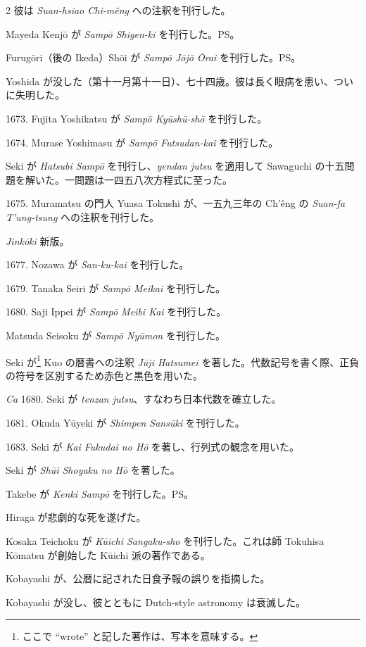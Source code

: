 \documentclass[11pt]{article}
\newcommand{\scanpage}[2]{\clearpage\setcounter{footnote}{0}\noindent{\footnotesize\color{gray}PDF #1 頁 · #2}\par\medskip}
\begin{document}
\scanpage{0195}{第23章年表、印刷頁181}
\begin{multicols}{2}\small
彼は \emph{Suan-hsiao Chi-mêng} への注釈を刊行した。

Mayeda Kenjō が \emph{Sampō Shigen-ki} を刊行した。PS。

Furugōri（後の Ikeda）Shōi が \emph{Sampō Jōjō Ōrai} を刊行した。PS。

Yoshida が没した（第十一月第十一日）、七十四歳。彼は長く眼病を患い、ついに失明した。

1673. Fujita Yoshikatsu が \emph{Sampō Kyūshū-shō} を刊行した。

1674. Murase Yoshimasu が \emph{Sampō Futsudan-kai} を刊行した。

Seki が \emph{Hatsubi Sampō} を刊行し、\emph{yendan jutsu} を適用して Sawaguchi の十五問題を解いた。一問題は一四五八次方程式に至った。

1675. Muramatsu の門人 Yuasa Tokushi が、一五九三年の Ch'êng の \emph{Suan-fa T'ung-tsung} への注釈を刊行した。

\emph{Jinkōki} 新版。

1677. Nozawa が \emph{San-ku-kai} を刊行した。

1679. Tanaka Seiri が \emph{Sampō Meikai} を刊行した。

1680. Saji Ippei が \emph{Sampō Meibi Kai} を刊行した。

Matsuda Seisoku が \emph{Sampō Nyūmon} を刊行した。

Seki が\footnote{ここで ``wrote'' と記した著作は、写本を意味する。} Kuo の暦書への注釈 \emph{Jūji Hatsumei} を著した。代数記号を書く際、正負の符号を区別するため赤色と黒色を用いた。

\emph{Ca} 1680. Seki が \emph{tenzan jutsu}、すなわち日本代数を確立した。

1681. Okuda Yūyeki が \emph{Shimpen Sansūki} を刊行した。

1683. Seki が \emph{Kai Fukudai no Hō} を著し、行列式の観念を用いた。

Seki が \emph{Shūi Shoyaku no Hō} を著した。

Takebe が \emph{Kenki Sampō} を刊行した。PS。

Hiraga が悲劇的な死を遂げた。

\columnbreak
Kosaka Teichoku が \emph{Kūichi Sangaku-sho} を刊行した。これは師 Tokuhisa Kōmatsu が創始した Kūichi 派の著作である。

Kobayashi が、公暦に記された日食予報の誤りを指摘した。

Kobayashi が没し、彼とともに Dutch-style astronomy は衰滅した。


\end{multicols}
\end{document}
